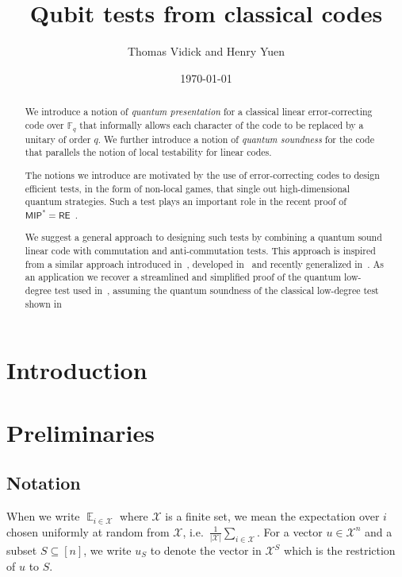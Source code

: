 \documentclass[11pt]{article}
\theoremstyle{definition}
\DeclareMathOperator*{\Expectation}{\mathbb{E}}
\newcommand{\Es}[1]{\Expectation_{#1}}
\newcommand{\F}{\ensuremath{\mathbb{F}}}
\newcommand{\mX}{\ensuremath{\mathcal{X}}}
\newcommand{\class}[1]{\ensuremath{\mathsf{#1}}\xspace}
\newcommand{\MIP}{\class{MIP}} %
\newcommand{\RE}{\class{RE}} %
\begin{document}
\title{Qubit tests from classical codes}

\author{Thomas Vidick and Henry Yuen}
\date{\today}
\maketitle

\noteswarning


\begin{abstract}
We introduce a notion of \emph{quantum presentation} for a classical linear error-correcting code over $\F_q$ that informally allows each character of the code to be replaced by a unitary of order $q$. We further introduce a notion of \emph{quantum soundness} for the code that parallels the notion of local testability for linear codes. 

The notions we introduce are motivated by the use of error-correcting codes to design efficient tests, in the form of non-local games, that single out high-dimensional quantum strategies. Such a test plays an important role in the recent proof of $\MIP^* = \RE$~\cite{ji2020mip}. 

We suggest a general approach to designing such tests by combining a quantum sound linear code with commutation and anti-commutation tests. This approach is inspired from a similar approach introduced in~\cite{natarajan2016robust}, developed in~\cite{ji2020mip} and recently generalized in~\cite{de2022spectral}. As an application we recover a streamlined and simplified proof of the quantum low-degree test used in~\cite{ji2020mip}, assuming the quantum soundness of the classical low-degree test shown in~\cite{ji2022quantum}
\end{abstract}


\section{Introduction}



	\section{Preliminaries}

\subsection{Notation}

When we write $\Es{i\in \mX}$ where $\mX$ is a finite set, we mean the expectation over $i$ chosen uniformly at random from $\mX$, i.e.\ $\frac{1}{|\mX|} \sum_{i\in \mX}$. For a vector $u \in \mX^n$ and a subset $S \subseteq [n]$, we write $u_S$ to denote the vector in $\mX^S$ which is the restriction of $u$ to $S$.
\end{document}

